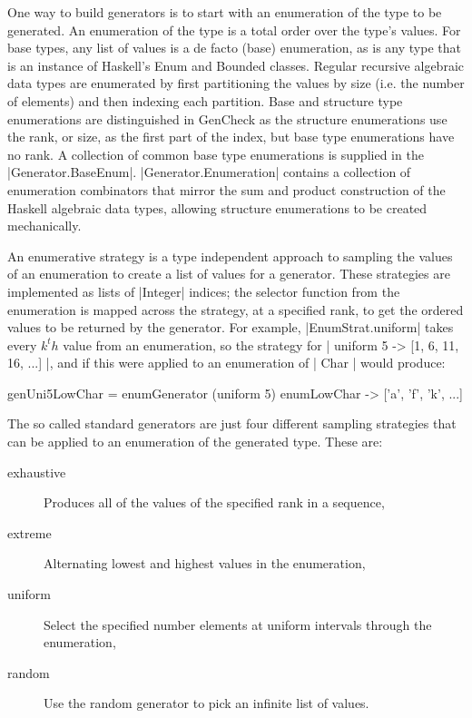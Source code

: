 One way to build generators is to start with an enumeration of the type to be generated.
An enumeration of the type is a total order over the type's values.  For base types,
any list of values is a de facto (base) enumeration, as is any type that is an instance
of Haskell's Enum and Bounded classes.  Regular recursive algebraic data types
are enumerated by first partitioning the values by size (i.e. the number of elements)
and then indexing each partition.  Base and structure type enumerations are
distinguished in GenCheck as the structure enumerations use the rank, or size,
as the first part of the index, but base type enumerations have no rank.
A collection of common base type enumerations is supplied in the |Generator.BaseEnum|.
|Generator.Enumeration| contains a collection of enumeration combinators
that mirror the sum and product construction of the Haskell algebraic data types,
allowing structure enumerations to be created mechanically.

An enumerative strategy is a type independent approach to sampling
the values of an enumeration to create a list of values for a generator.
These strategies are implemented as lists of |Integer| indices;
the selector function from the enumeration is mapped across the strategy,
at a specified rank, to get the ordered values to be returned by the generator.
For example, |EnumStrat.uniform| takes every $k^th$ value from an enumeration,
so the strategy for | uniform 5 ->  [1, 6, 11, 16, ...] |, and if this were applied to 
an enumeration of | Char | would produce:

\begin{code}
genUni5LowChar = enumGenerator (uniform 5) enumLowChar 
-> ['a', 'f', 'k', ...]
\end{code}

The so called standard generators are just four different sampling strategies
that can be applied to an enumeration of the generated type.  These are:

\begin{description}
\item[exhaustive] {Produces all of the values of the specified rank in a sequence,}
\item[extreme]{Alternating lowest and highest values in the enumeration,}
\item[uniform]{Select the specified number elements at uniform intervals through the enumeration,}
\item[random]{Use the random generator to pick an infinite list of values.}
\end{description}

